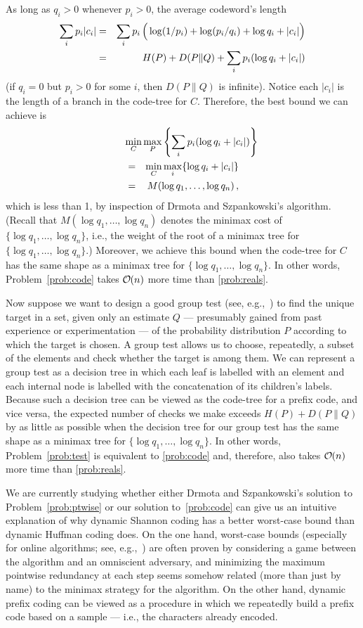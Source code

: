 \documentclass[runningheads]{llncs}
\newcommand{\Oh}[1]
    {\ensuremath{\mathcal{O} \hspace{-.5ex} \left( {#1} \right)}}
\begin{document}
As long as \(q_i > 0\) whenever \(p_i > 0\), the average codeword's length
\begin{eqnarray*}
\sum_i p_i |c_i|
& = & \sum_i p_i \left( \rule{0ex}{2.5ex}
    \log (1 / p_i) + \log (p_i / q_i) + \log q_i + |c_i| \right)\\
& = & H (P) + D (P \| Q) + \sum_i p_i (\log q_i + |c_i|)
\end{eqnarray*}
(if \(q_i = 0\) but \(p_i > 0\) for some $i$, then \(D (P \| Q)\) is infinite). Notice each $|c_i|$ is the length of a branch in the code-tree for $C$. Therefore, the best bound we can achieve is
\begin{eqnarray*}
\lefteqn{\min_C \max_P \left\{ \sum_i p_i (\log q_i + |c_i|) \right\}}\\
& = & \min_C \max_i \{\log q_i + |c_i|\}\\
& = & M (\log q_1, \ldots, \log q_n)\,,
\end{eqnarray*}
which is less than 1, by inspection of Drmota and Szpankowski's algorithm.  (Recall that \(M (\log q_1, \ldots, \log q_n)\) denotes the minimax cost of \(\{\log q_1, \ldots, \log q_n\}\), i.e., the weight of the root of a minimax tree for \(\{\log q_1, \ldots, \log q_n\}\).)  Moreover, we achieve this bound when the code-tree for $C$ has the same shape as a minimax tree for \(\{\log q_1, \ldots, \log q_n\}\).  In other words, Problem~\ref{prob:code} takes $\Oh{n}$ more time than \ref{prob:reals}.

Now suppose we want to design a good group test (see, e.g.,~\cite{AW87,Aig88}) to find the unique target in a set, given only an estimate $Q$ --- presumably gained from past experience or experimentation --- of the probability distribution $P$ according to which the target is chosen.  A group test allows us to choose, repeatedly, a subset of the elements and check whether the target is among them.  We can represent a group test as a decision tree in which each leaf is labelled with an element and each internal node is labelled with the concatenation of its children's labels.  Because such a decision tree can be viewed as the code-tree for a prefix code, and vice versa, the expected number of checks we make exceeds \(H (P) + D (P \| Q)\) by as little as possible when the decision tree for our group test has the same shape as a minimax tree for \(\{\log q_1, \ldots, \log q_n\}\).  In other words, Problem~\ref{prob:test} is equivalent to \ref{prob:code} and, therefore, also takes $\Oh{n}$ more time than \ref{prob:reals}.

We are currently studying whether either Drmota and Szpankowski's solution to Problem~\ref{prob:ptwise} or our solution to~\ref{prob:code} can give us an intuitive explanation of why dynamic Shannon coding has a better worst-case bound than dynamic Huffman coding does.  On the one hand, worst-case bounds (especially for online algorithms; see, e.g.,~\cite{BE98}) are often proven by considering a game between the algorithm and an omniscient adversary, and minimizing the maximum pointwise redundancy at each step seems somehow related (more than just by name) to the minimax strategy for the algorithm.  On the other hand, dynamic prefix coding can be viewed as a procedure in which we repeatedly build a prefix code based on a sample --- i.e., the characters already encoded.
\end{document}
